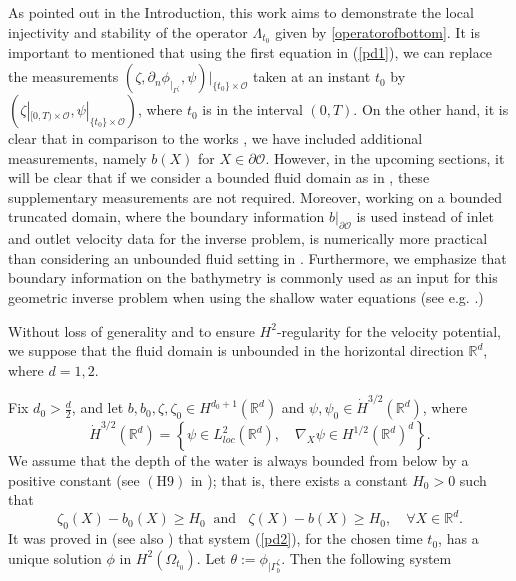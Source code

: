 \documentclass[11pt]{article}
\begin{document}
As pointed out in the Introduction, this work aims to demonstrate the local injectivity and stability of the operator $\Lambda _{t_0}$ given by \eqref{operatorofbottom}. It is important to mentioned that using the first equation in (\ref{pd1}), we can replace the measurements $\left(\zeta, \partial_n\phi_{|_{\Gamma^{\zeta}}}, \psi\right)|_{\{t_0\}\times \mathcal O }$ taken at an instant $t_0$ by $\left(\zeta|_{[0,T ) \times \mathcal O },\psi|_{\{t_0\}\times \mathcal O }\right)$, where $t_0$ is in the interval $(0,T)$. On the other hand, it is clear that in comparison to the works \cite{fontelos2017bottom,lecaros2020stability}, we have included additional measurements, namely $b(X)$ for $X\in \partial \mathcal O$. However, in the upcoming sections, it will be clear that if we consider a bounded fluid domain as in  \cite{lecaros2020stability}, these supplementary measurements are not required. Moreover, working on a bounded truncated domain, where the boundary information $b|_{\partial\mathcal O}$ is used instead of inlet and outlet velocity data for the inverse problem, is numerically more practical than considering an unbounded fluid setting in \cite{fontelos2017bottom}. Furthermore, we emphasize that boundary information on the bathymetry is commonly used as an input for this geometric inverse problem when using the shallow water equations (see e.g. \cite{angel2024bathymetry,gessese2011reconstruction,meandCarole}.)



Without loss of generality and to ensure $H^2$-regularity for the velocity potential, we suppose that the fluid domain is unbounded in the horizontal direction $\mathbb{R}^{d}$, where $d=1,2.$

Fix $d_0>\frac{d}{2}$, and let $b,b_0,\zeta,\zeta_0 \in H^{d_0+1}(\mathbb{R}^d)$ and $\psi,\psi_0 \in \dot{H}^{3/2}(\mathbb{R}^d)$, where
$$\dot{H}^{3/2}(\mathbb{R} ^d)=\left\{  \psi\in L^2_{loc}(\mathbb{R} ^d),\quad\nabla_X\psi\in H^{1/2}(\mathbb{R} ^d)^{d} \right\}.$$
We assume that the depth of the water is always bounded from below by a positive constant (see $(\text{H}9)$ in \cite{lannes2013water}); that is,  there exists a constant $H_0>0$ such that 
\begin{equation}\label{conditionofliquid}
	\zeta_0(X)-b_0(X)\geq H_0\;\;\text{and }\;\; \zeta(X)-b(X)\geq H_0,\quad \forall X\in \mathbb{R} ^d. 
\end{equation}
It was proved in \cite{lannes2013water} (see also \cite[Lemma 2.5]{fontelos2017bottom}) that system (\ref{pd2}), for the chosen time $t_0$, has a unique solution $\phi$ in $H^2(\Omega _{t_0})$. Let $\theta :=\phi _{\vert  \Gamma ^\zeta _b }$.  Then  the following system
\end{document}
